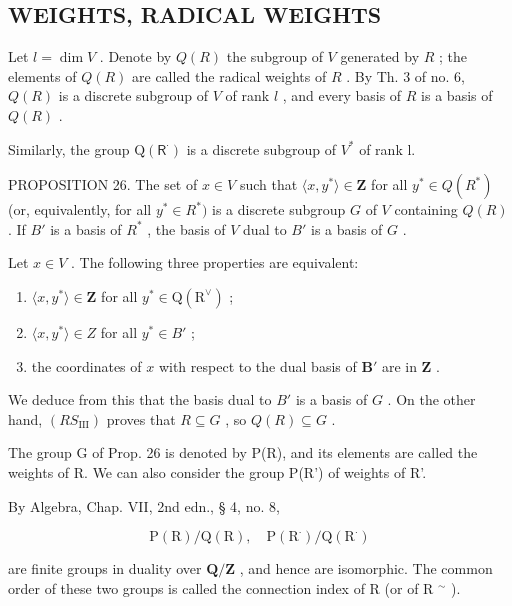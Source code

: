 \subsection{WEIGHTS, RADICAL WEIGHTS}

Let \(l = \dim V\) . Denote by \(Q(R)\) the subgroup of \(V\) generated by \(R\) ; the elements of \(Q(R)\) are called the radical weights of \(R\) . By Th. 3 of no. 6, \(Q(R)\) is a discrete subgroup of \(V\) of rank \(l\) , and every basis of \(R\) is a basis of \(Q(R)\) .

Similarly, the group \(\mathrm{Q}(\mathsf{R}^{\cdot})\) is a discrete subgroup of \(V^{*}\) of rank l.

PROPOSITION 26. The set of \(x \in V\) such that \(\langle x, y^* \rangle \in \mathbf{Z}\) for all \(y^* \in Q(R^*)\) (or, equivalently, for all \(y^* \in R^*)\) is a discrete subgroup \(G\) of \(V\) containing \(Q(R)\) . If \(B'\) is a basis of \(R^*\) , the basis of \(V\) dual to \(B'\) is a basis of \(G\) .

Let \(x \in V\) . The following three properties are equivalent:

\begin{enumerate}
\def\labelenumi{(\roman{enumi})}
\item
  \(\langle x, y^{*} \rangle \in \mathbf{Z}\) for all \(y^{*} \in \mathrm{Q}(\mathrm{R}^{\vee})\) ;
\item
  \(\langle x, y^{*} \rangle \in Z\) for all \(y^{*} \in B'\) ;
\item
  the coordinates of \(x\) with respect to the dual basis of \(\mathbf{B}'\) are in \(\mathbf{Z}\) .
\end{enumerate}

We deduce from this that the basis dual to \(B'\) is a basis of \(G\) . On the other hand, \((RS_{\mathrm{III}})\) proves that \(R \subseteq G\) , so \(Q(R) \subseteq G\) .

The group G of Prop. 26 is denoted by P(R), and its elements are called the weights of R. We can also consider the group P(R') of weights of R'.

By Algebra, Chap. VII, 2nd edn., § 4, no. 8,

\[
\mathrm{P} (\mathrm{R}) / \mathrm{Q} (\mathrm{R}), \quad \mathrm{P} (\mathrm{R} ^ {\cdot}) / \mathrm{Q} (\mathrm{R} ^ {\cdot})
\]

are finite groups in duality over \(\mathbf{Q} / \mathbf{Z}\) , and hence are isomorphic. The common order of these two groups is called the connection index of R (or of R \(^{\sim}\) ).

